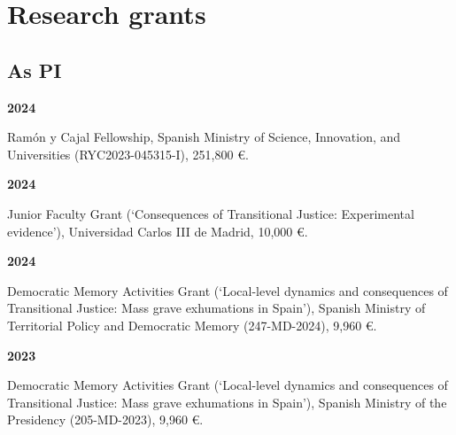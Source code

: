 \documentclass[a4paper, 12pt]{article}
\begin{document}
\section*{Research grants}

\subsection*{As PI}
\vspace{10pt}

\begin{minipage}[t]{0.1\textwidth}
\textbf{2024}
\end{minipage}\hfill\begin{minipage}[t]{0.9\textwidth}
Ramón y Cajal Fellowship, Spanish Ministry of Science, Innovation, and Universities (RYC2023-045315-I), 251,800 €.\\\vspace{-8pt}
\end{minipage}
\begin{minipage}[t]{0.1\textwidth}
\textbf{2024}
\end{minipage}\hfill\begin{minipage}[t]{0.9\textwidth}
Junior Faculty Grant (`Consequences of Transitional Justice: Experimental evidence'), Universidad Carlos III de Madrid, 10,000 €.\\\vspace{-8pt} %
\end{minipage}
\begin{minipage}[t]{0.1\textwidth}
\textbf{2024}
\end{minipage}\hfill\begin{minipage}[t]{0.9\textwidth}
Democratic Memory Activities Grant (`Local-level dynamics and consequences of Transitional Justice: Mass grave exhumations in Spain'), Spanish Ministry of Territorial Policy and Democratic Memory (247-MD-2024), 9,960 €.\\\vspace{-8pt} %
\end{minipage}
\begin{minipage}[t]{0.1\textwidth}
\textbf{2023}
\end{minipage}\hfill\begin{minipage}[t]{0.9\textwidth}
Democratic Memory Activities Grant (`Local-level dynamics and consequences of Transitional Justice: Mass grave exhumations in Spain'), Spanish Ministry of the Presidency (205-MD-2023), 9,960 €.\\\vspace{-8pt} %
\end{minipage}
\end{document}
